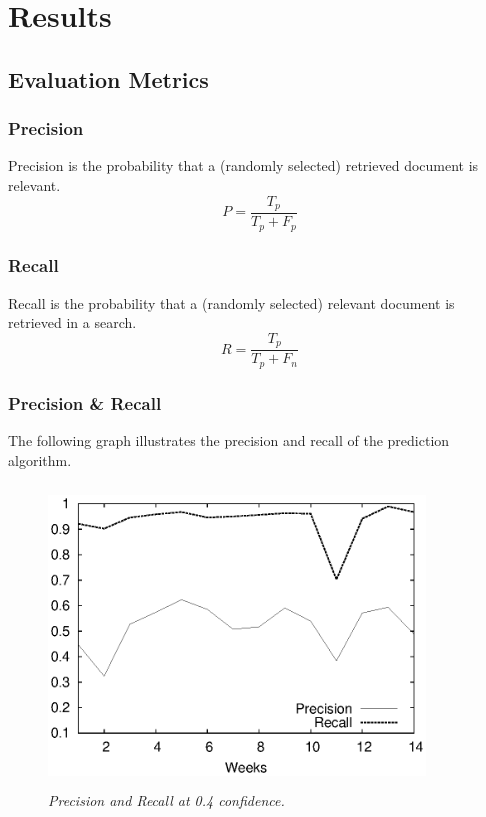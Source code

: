 %

\chapter{Results}

\section{Evaluation Metrics}

\subsection{Precision}
Precision is the probability that a (randomly selected) retrieved document is relevant.
\begin{equation}
P = \frac{T_p}{T_p + F_p} \nonumber
\end{equation}

\subsection{Recall}
Recall is the probability that a (randomly selected) relevant document is retrieved in a search.
\begin{equation}
R = \frac{T_p}{T_p + F_n} \nonumber
\end{equation}

\subsection{Precision \& Recall}
The following graph illustrates the precision and recall of the prediction algorithm.
	\begin{figure}[t]
		\begin{center}
			\includegraphics[width=10cm,height=8cm]{figures/precision.eps} 
			\caption{\small \sl Precision and Recall at 0.4 confidence.\label{fig:Label7}} 
		\end{center} 
	\end{figure}



